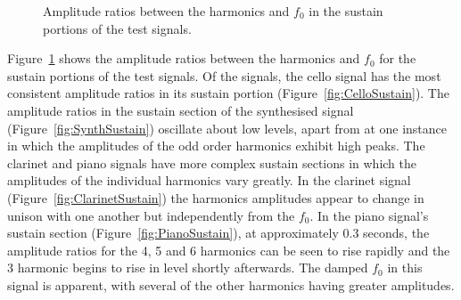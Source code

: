 \begin{figure}[h!]
			\quad
			\caption{Amplitude ratios between the harmonics and $f_{0}$ in the sustain
				 portions of the test signals.}
			\label{fig:SustainAmplitudes}
		\end{figure}

		Figure~\ref{fig:SustainAmplitudes} shows the amplitude ratios between the harmonics and $f_{0}$ for the
		sustain portions of the test signals. Of the signals, the cello signal has the most consistent amplitude
		ratios in its sustain portion (Figure~\ref{fig:CelloSustain}). The amplitude ratios in the sustain section
		of the synthesised signal (Figure~\ref{fig:SynthSustain}) oscillate about low levels, apart from at one
		instance in which the amplitudes of the odd order harmonics exhibit high peaks. The clarinet and piano
		signals have more complex sustain sections in which the amplitudes of the individual harmonics vary
		greatly. In the clarinet signal (Figure~\ref{fig:ClarinetSustain}) the harmonics amplitudes appear to
		change in unison with one another but independently from the $f_{0}$. In the piano signal's sustain section
		(Figure~\ref{fig:PianoSustain}), at approximately 0.3 seconds, the amplitude ratios for the 4,
		5 and 6 harmonics can be seen to rise rapidly and the 3 harmonic begins to
		rise in level shortly afterwards. The damped $f_{0}$ in this signal is apparent, with several of the other
		harmonics having greater amplitudes.

